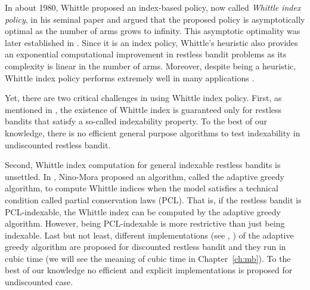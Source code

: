 In about 1980, Whittle proposed an index-based policy, now called \emph{Whittle index policy}, in his seminal paper \cite{whittle1988restless} and argued that the proposed policy is asymptotically optimal as the number of arms grows to infinity.
This asymptotic optimality was later established in \cite{weber1990index}.
Since it is an index policy, Whittle's heuristic also provides an exponential computational improvement in restless bandit problems as its complexity is linear in the number of arms.
Moreover, despite being a heuristic, Whittle index policy performs extremely well in many applications \cite{glazebrook2002index, ansell2003whittle, glazebrook2006some, avrachenkov2013congestion, akbarzadeh2019restless}.

Yet, there are two critical challenges in using Whittle index policy.
First, as mentioned in \cite[Chapter~14]{whittle1996optimal}, the existence of Whittle index is guaranteed only for restless bandits that satisfy a so-called indexability property.
To the best of our knowledge, there is no efficient general purpose algorithms to test indexability in undiscounted restless bandit.

Second, Whittle index computation for general indexable restless bandits is unsettled.
In \cite{nino2007dynamic}, Nino-Mora proposed an algorithm, called the adaptive greedy algorithm, to compute Whittle indices when the model satisfies a technical condition called partial conservation laws (PCL).
That is, if the restless bandit is PCL-indexable, the Whittle index can be computed by the adaptive greedy algorithm.
However, being PCL-indexable is more restrictive than just being indexable.
Last but not least, different implementations (see \eg, \cite{nino2020fast, akbarzadeh2020conditions}) of the adaptive greedy algorithm are proposed for discounted restless bandit and they run in cubic time (we will see the meaning of cubic time in Chapter~\ref{ch:mb}).
To the best of our knowledge no efficient and explicit implementations is proposed for undiscounted case.

